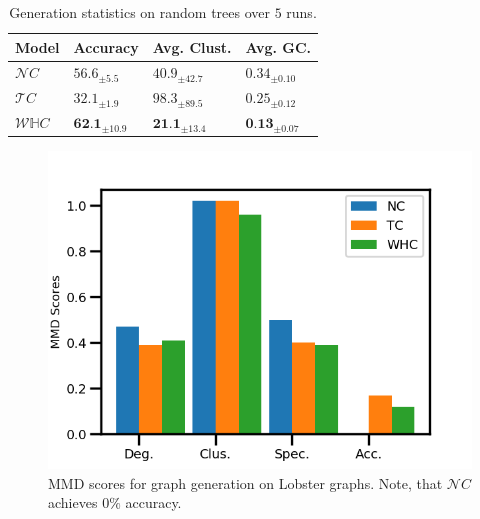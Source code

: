 \begin{table}[]
\label{graph_gen_table}
\begin{center}
\begin{tabular}{llll}
    \toprule
    Model   & Accuracy & Avg. Clust. & Avg. GC.\\
    \midrule
    $\mathcal{N}C$ & $56.6_{\pm 5.5}$ & $40.9_{\pm 42.7}$ & $0.34_{\pm0.10}$\\
    $\mathcal{T}C$ & $32.1_{\pm 1.9}$ & $98.3_{\pm 89.5}$ & $0.25_{\pm 0.12}$\\
    $\mathcal{W}\mathbb{H}C$ & $\textbf{62.1}_{\pm 10.9}$ & $\textbf{21.1}_{\pm 13.4}$ & $\textbf{0.13}_{\pm0.07}$\\
    \bottomrule
\end{tabular}
\end{center}
\caption{Generation statistics on random trees over $5$ runs.}
\label{tab:randtrees}
\vspace{-15pt}
\end{table}

\begin{figure}
    \centering
    \includegraphics[width=0.85\linewidth]{lobster_graph_gen.png}
    \vspace{-15pt}
    \caption{MMD scores for graph generation on Lobster graphs. Note, that $\mathcal{N}C$ achieves $0\%$ accuracy.}
    \label{fig:lobster_graph_gen}
    \vspace{-15pt}
\end{figure}

